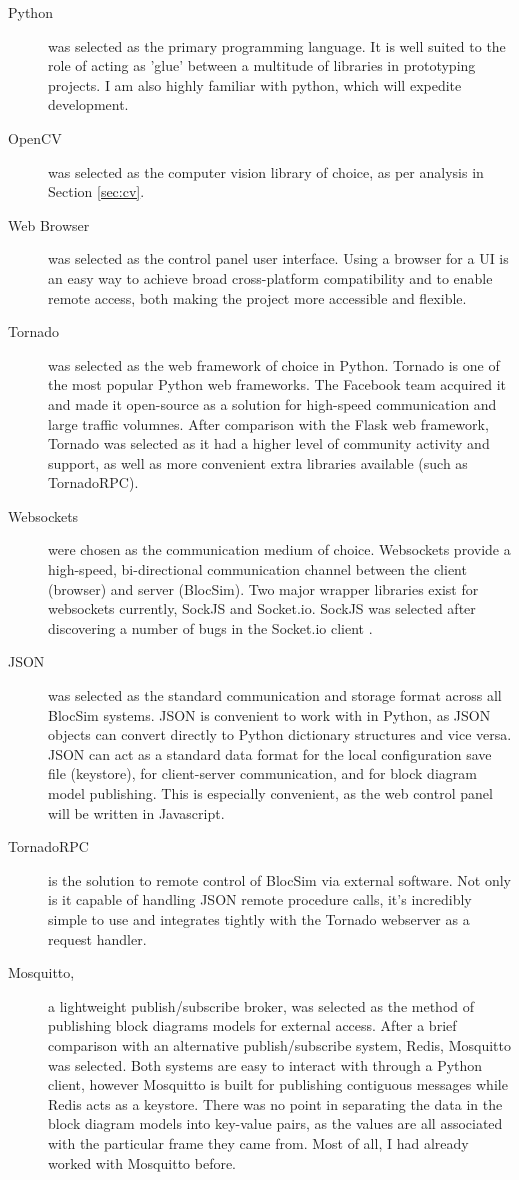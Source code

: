 \begin{description}
	\item[Python] was selected as the primary programming language. It is well suited to the role of acting as 'glue' between a multitude of libraries in prototyping projects. I am also highly familiar with python, which will expedite development.
	\item[OpenCV] was selected as the computer vision library of choice, as per analysis in Section \ref{sec:cv}.
	\item[Web Browser] was selected as the control panel user interface. Using a browser for a UI is an easy way to achieve broad cross-platform compatibility and to enable remote access, both making the project more accessible and flexible.
	\item[Tornado] was selected as the web framework of choice in Python. Tornado is one of the most popular Python web frameworks. The Facebook team acquired it and made it open-source as a solution for high-speed communication and large traffic volumnes. After comparison with the Flask \footnotemark[11] web framework, Tornado was selected as it had a higher level of community activity and support, as well as more convenient extra libraries available (such as TornadoRPC).
	\item[Websockets] were chosen as the communication medium of choice. Websockets provide a high-speed, bi-directional communication channel between the client (browser) and server (BlocSim). Two major wrapper libraries exist for websockets currently, SockJS and Socket.io\footnotemark[12]. SockJS was selected after discovering a number of bugs in the Socket.io client \cite{socketioBugs}.
	\item[JSON] was selected as the standard communication and storage format across all BlocSim systems. JSON is convenient to work with in Python, as JSON objects can convert directly to Python dictionary structures and vice versa. JSON can act as a standard data format for the local configuration save file (keystore), for client-server communication, and for block diagram model publishing. This is especially convenient, as the web control panel will be written in Javascript.
	\item[TornadoRPC] is the solution to remote control of BlocSim via external software. Not only is it capable of handling JSON remote procedure calls, it's incredibly simple to use and integrates tightly with the Tornado webserver as a request handler.
	\item[Mosquitto,] a lightweight publish/subscribe broker, was selected as the method of publishing block diagrams models for external access. After a brief comparison with an alternative publish/subscribe system, Redis\footnotemark[13], Mosquitto was selected. Both systems are easy to interact with through a Python client, however Mosquitto is built for publishing contiguous messages while Redis acts as a keystore. There was no point in separating the data in the block diagram models into key-value pairs, as the values are all associated with the particular frame they came from. Most of all, I had already worked with Mosquitto before.
\end{description}


